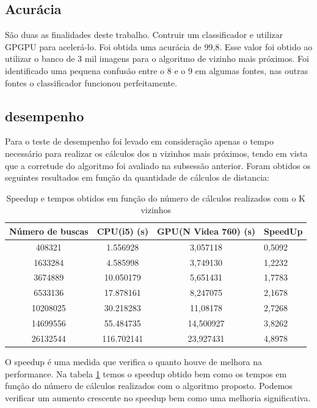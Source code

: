\documentclass[letterpaper, 10 pt, conference]{ieeeconf}  %
\begin{document}
\subsection{Acurácia}
São duas as finalidades deste trabalho. Contruir um classificador e utilizar
GPGPU para acelerá-lo. Foi obtida uma acurácia de 99,8. Esse valor foi obtido ao
utilizar o banco de 3 mil imagens para o algoritmo de vizinho mais próximos. Foi
identificado uma pequena confusão entre o 8 e o 9 em algumas fontes, nas outras
fontes o classificador funcionou perfeitamente.

\subsection{desempenho}
Para o teste de desempenho foi levado em consideração apenas o tempo necessário
para realizar os cálculos dos n vizinhos mais próximos, tendo em vista que a
corretude do algoritmo foi avaliado na subsessão anterior.
Foram obtidos os seguintes resultados em função da quantidade de cálculos de
distancia:
\begin{table}[h]
\centering
\begin{tabular}{|c|c|c|l|}
\hline
Número de buscas & CPU(i5) (s) & GPU(N Videa 760) (s) & SpeedUp \\ \hline
408321           & 1.556928    & 3,057118             & 0,5092  \\ \hline
1633284          & 4.585998    & 3,749130             & 1,2232  \\ \hline
3674889          & 10.050179   & 5,651431             & 1,7783  \\ \hline
6533136          & 17.878161   & 8,247075             & 2,1678  \\ \hline
10208025         & 30.218283   & 11,08178             & 2,7268  \\ \hline
14699556         & 55.484735   & 14,500927            & 3,8262  \\ \hline
26132544         & 116.702141  & 23,927431            & 4,8978  \\ \hline
\end{tabular}
\caption{Speedup e tempos obtidos em função do número de cálculos realizados
com o K vizinhos}
\label{tab:speedup}
\end{table}

O speedup é uma medida que verifica o
quanto houve de melhora na performance. Na tabela \ref{tab:speedup} temos o
speedup obtido bem como os tempos em função do número de cálculos realizados com
o algoritmo proposto. Podemos verificar um aumento crescente no speedup bem como
uma melhoria significativa.
\end{document}
